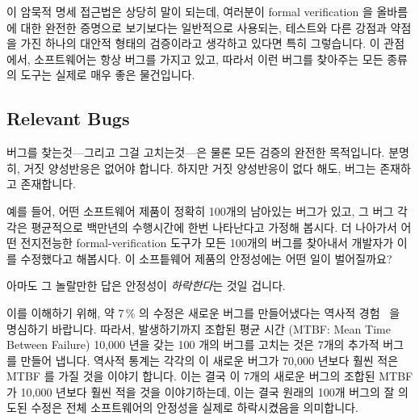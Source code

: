 이 암묵적 명세 접근법은 상당히 말이 되는데, 여러분이 formal verification 을
올바름에 대한 완전한 증명으로 보기보다는 일반적으로 사용되는, 테스트와 다른
강점과 약점을 가진 하나의 대안적 형태의 검증이라고 생각하고 있다면 특히
그렇습니다.
이 관점에서, 소프트웨어는 항상 버그를 가지고 있고, 따라서 이런 버그를 찾아주는
모든 종류의 도구는 실제로 매우 좋은 물건입니다.
\iffalse

This implicit-specification approach makes quite a bit of sense, particularly
if you look at formal verification not as a full proof of correctness,
but rather an alternative form of validation with a different set of
strengths and weaknesses than the common case, that is, testing.
From this viewpoint, software will always have bugs, and therefore any
tool of any kind that helps to find those bugs is a very good thing
indeed.
\fi

\subsection{Relevant Bugs}
\label{sec:future:Relevant Bugs}

버그를 찾는것---그리고 그걸 고치는것---은 물론 모든 검증의 완전한 목적입니다.
분명히, 거짓 양성반응은 없어야 합니다.
하지만 거짓 양성반응이 없다 해도, 버그는 존재하고 존재합니다.

예를 들어, 어떤 소프트웨어 제품이 정확히 100개의 남아있는 버그가 있고, 그 버그
각각은 평균적으로 백만년의 수행시간에 한번 나타난다고 가정해 봅시다.
더 나아가서 어떤 전지전능한 formal-verification 도구가 모든 100개의 버그를
찾아내서 개발자가 이를 수정했다고 해봅시다.
이 소프틑웨어 제품의 안정성에는 어떤 일이 벌어질까요?

아마도 그 놀랄만한 답은 안정성이 \emph{하락한다}는 것일 겁니다.
\iffalse

Finding bugs---and fixing them---is of course the whole point of any
type of validation effort.
Clearly, false positives are to be avoided.
But even in the absense of false positives, there are bugs and there are bugs.

For example, suppose that a software artifact had exactly 100 remaining
bugs, each of which manifested on average once every million years
of runtime.
Suppose further that an omniscient formal-verification tool located
all 100 bugs, which the developers duly fixed.
What happens to the reliability of this software artifact?

The perhaps surprising answer is that the reliability \emph{decreases}.
\fi

이를 이해하기 위해, 약 7\,\% 의 수정은 새로운 버그를 만들어냈다는 역사적
경험~\cite{RexBlack2012SQA} 을 명심하기 바랍니다.
따라서, 발생하기까지 조합된 평균 시간 (MTBF: Mean Time Between Failure) 10,000
년을 갖는 100 개의 버그를 고치는 것은 7개의 추가적 버그를 만들어 냅니다.
역사적 통계는 각각의 이 새로운 버그가 70,000 년보다 훨씬 적은 MTBF 를 가질 것을
이야기 합니다.
이는 결국 이 7개의 새로운 버그의 조합된 MTBF 가 10,000 년보다 훨씬 적을 것을
이야기하는데, 이는 결국 원래의 100개 버그의 잘 의도된 수정은 전체 소프트웨어의
안정성을 실제로 하락시켰음을 의미합니다.
\iffalse

